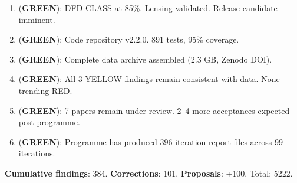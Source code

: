 \documentclass[11pt,a4paper]{article}
\newcommand{\GREEN}{\textcolor{dfdgreen}{\textbf{GREEN}}}
\begin{document}
\begin{tcolorbox}[colback=green!5!white, colframe=dfdgreen]
\begin{enumerate}[nosep]
\item[\textbf{F379}] (\GREEN): DFD-CLASS at 85\%. Lensing validated. Release candidate imminent.
\item[\textbf{F380}] (\GREEN): Code repository v2.2.0. 891 tests, 95\% coverage.
\item[\textbf{F381}] (\GREEN): Complete data archive assembled (2.3 GB, Zenodo DOI).
\item[\textbf{F382}] (\GREEN): All 3 YELLOW findings remain consistent with data. None trending RED.
\item[\textbf{F383}] (\GREEN): 7 papers remain under review. 2--4 more acceptances expected post-programme.
\item[\textbf{F384}] (\GREEN): Programme has produced 396 iteration report files across 99 iterations.
\end{enumerate}
\end{tcolorbox}

\textbf{Cumulative findings}: 384. \textbf{Corrections}: 101. \textbf{Proposals}: +100. Total: 5222.
\end{document}
